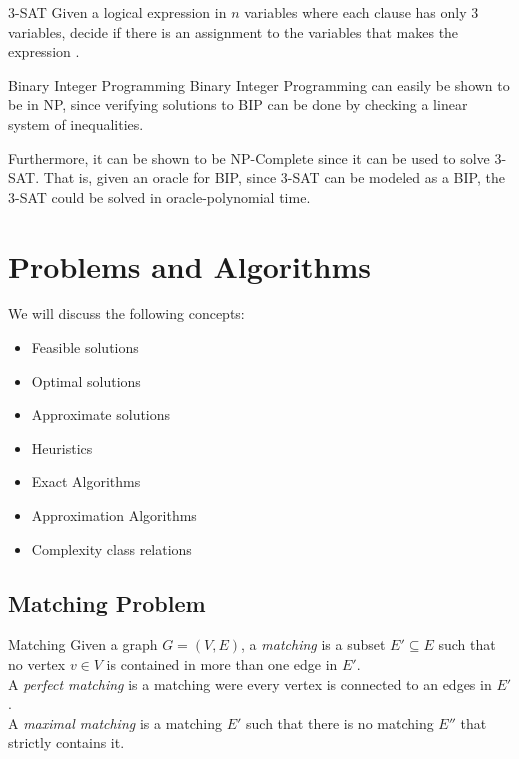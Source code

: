 \begin{general}{3-SAT}{\npcomplete}
Given a logical expression in $n$ variables where each clause has only 3 variables, decide if there is an assignment to the variables that makes the expression \true.
\end{general}

\begin{general}{Binary Integer Programming}{\npcomplete}
Binary Integer Programming can easily be shown to be in NP, since verifying solutions to BIP can be done by checking a linear system of inequalities.  

Furthermore, it can be shown to be NP-Complete since it can be used to solve 3-SAT.  That is, given an oracle for BIP, since 3-SAT can be modeled as a BIP,  the 3-SAT could be solved in oracle-polynomial time.
\end{general}

\section{Problems and Algorithms}
We will discuss the following concepts:
\begin{itemize}
\item Feasible solutions
\item Optimal solutions
\item Approximate solutions
\item Heuristics
\item Exact Algorithms
\item Approximation Algorithms
\item Complexity class relations
\end{itemize}

\subsection{Matching Problem}

\begin{definition}{Matching}{}
Given a graph $G = (V,E)$, a \emph{matching} is a subset $E' \subseteq E$ such that no vertex $v \in V$ is contained in more than one edge in $E'$.  \\
A \emph{perfect matching} is a matching were every vertex is connected to an edges in $E'$.\\
A \emph{maximal matching} is a matching $E'$ such that there is no matching $E''$ that strictly contains it.
\end{definition}

